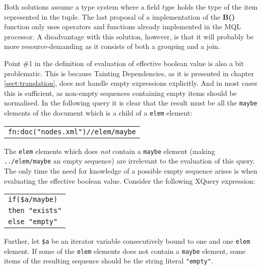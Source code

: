 Both solutions assume a type system where a field $type$ holds the type of the
item represented in the tuple. The last proposal of a implementation of the \textbf{B()} function only uses operators and functions already
implemented in the MQL processor. A disadvantage with this solution, however, is that it will probably be more
resource-demanding as it consists of both a grouping and a join.

Point \#1 in the definition of evaluation of effective boolean value is also a
bit problematic. This is because Tainting Dependencies, as it is presented in chapter \ref{sect:translation},
does not handle empty expressions explicitly. And in most cases this is sufficient, as non-empty sequences containing empty items should be
normalised. In the following query it is clear that the result must be all the \texttt{maybe} elements of the
document which is a child of a \texttt{elem} element:

\begin{center}
\begin{tabular}{l}
\texttt{fn:doc("nodes.xml")//elem/maybe}
\end{tabular}
\end{center}

The \texttt{elem} elements which does \emph{not} contain a \texttt{maybe} element (making \texttt{../elem/maybe}
an empty sequence) are irrelevant to the evaluation of this query. The only time the need for knowledge of a
possible empty sequence arises is when evaluating the effective boolean value. Consider the following XQuery
expression:

\begin{center}
\begin{tabular}{l}
\texttt{if(\$a/maybe)} \\ \quad
\texttt{then "exists"} \\ \quad
\texttt{else "empty"}
\end{tabular}
\end{center}

Further, let \texttt{\$a} be an iterator variable consecutively bound to one and one \texttt{elem} element. If
some of the \texttt{elem} elements does not contain a \texttt{maybe} element, some items of the resulting sequence
should be the string literal \texttt{"empty"}.

